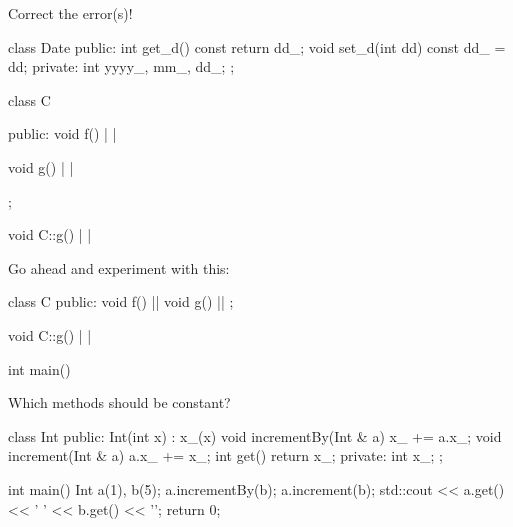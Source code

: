 \begin{ex}
Correct the error(s)!

\begin{consolethree}[escapeinside=||]
class Date
{
public:
    int get_d() const
    {
        return dd_;
    }
    void set_d(int dd) const
    {
        dd_ = dd;
    }
private:
    int yyyy_, mm_, dd_;
};
\end{consolethree}
\end{ex}


\begin{consolethree}[escapeinside=||]
class C
{
public:
    void f() |  |
    {}
    
    void g() | |
};

void C::g() |  |
{}
\end{consolethree}
Go ahead and experiment with this:

\begin{consolethree}[escapeinside=||]
class C{
public:
    void f() || 
    {}
    void g() || 
};

void C::g() |  |
{}

int main()
{}
\end{consolethree}

\begin{ex}
Which methods should be constant?

\begin{consolethree}[escapeinside=||]
class Int
{
public:
    Int(int x)
        : x_(x)
    {}
    void incrementBy(Int & a)
    {
        x_ += a.x_;
    }
    void increment(Int & a)
    {
        a.x_ += x_;
    }
    int get()
    {
        return x_;
    }
private:
    int x_;
};

int main()
{
    Int a(1), b(5);
    a.incrementBy(b);
    a.increment(b);
    std::cout << a.get() << ' ' << b.get() << '\n';
    return 0;
}
\end{consolethree}
\end{ex}

